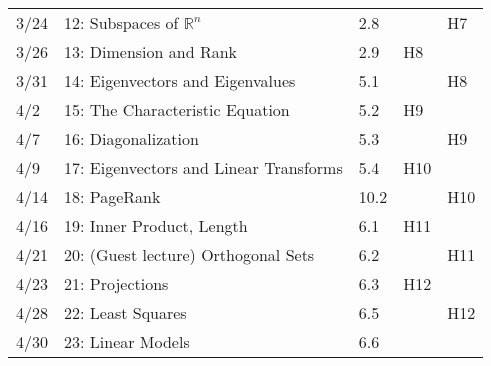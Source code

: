 \documentclass[11pt]{article}
\begin{document}
\begin{centering}
\begin{tabular}{||l|p{3in}|l|l|l||}
3/24 & 12: Subspaces of $\mathbb{R}^n$ & 2.8 & & H7\\ 
3/26 & 13: Dimension and Rank & 2.9 & H8 &\\ 
\hline

3/31 & 14: Eigenvectors and Eigenvalues & 5.1 &  & H8\\ 
4/2 & 15: The Characteristic Equation & 5.2 & H9 &\\ 
\hline

4/7 & 16: Diagonalization & 5.3 & & H9\\ 
4/9 & 17: Eigenvectors and Linear Transforms & 5.4 & H10 &\\
\hline

4/14 & 18: PageRank & 10.2 & & H10\\ %
4/16 & 19: Inner Product, Length & 6.1 & H11 &\\ 
 \hline

4/21 & 20: (Guest lecture) Orthogonal Sets & 6.2 & & H11\\ 
4/23 & 21: Projections & 6.3 & H12 & \\
\hline

4/28 & 22: Least Squares & 6.5 & & H12\\ 
4/30 & 23: Linear Models & 6.6 &  &\\ 
\hline\hline


\end{tabular}\\
\end{centering}
\end{document}
